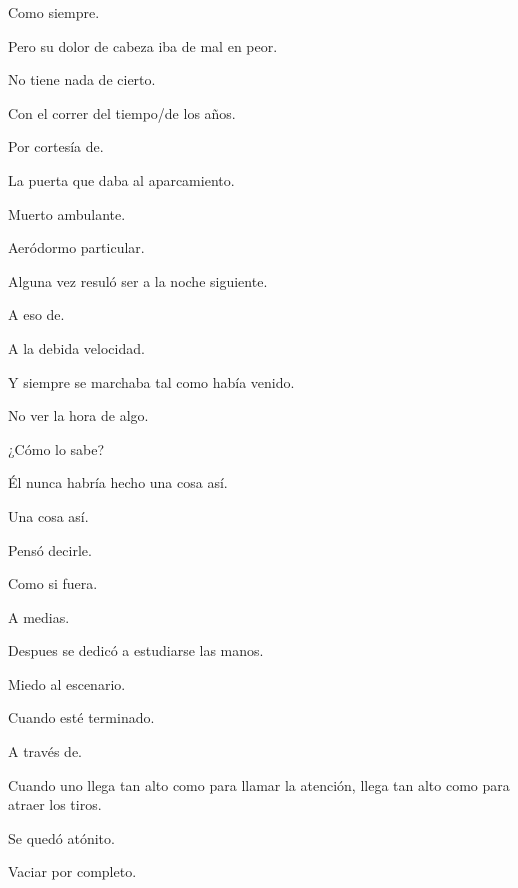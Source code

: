 \sk
Como siempre. 

\sk
Pero su dolor de cabeza iba de mal en peor. 

\sk
No tiene nada de cierto. 

\sk
Con el correr del tiempo/de los años. 

\sk
Por cortesía de. 

\sk
La puerta que daba al aparcamiento. 

\sk
Muerto ambulante. 

\sk
Aeródormo particular. 

\sk
Alguna vez resuló ser a la noche siguiente. 

\sk
A eso de. 

\sk
A la debida velocidad. 

\sk
Y siempre se marchaba tal como había venido. 

\sk
No ver la hora de algo. 

\sk
¿Cómo lo sabe? 

\sk
Él nunca habría hecho una cosa así.  

\sk
Una cosa así. 

\sk
Pensó decirle. 

\sk
Como si fuera. 

\sk
A medias. 

\sk
Despues se dedicó a estudiarse las manos. 

\sk
Miedo al escenario. 

\sk
Cuando esté terminado. 

\sk
A través de. 

\sk
Cuando uno llega tan alto como para llamar la atención, llega tan alto como para atraer los tiros. 

\sk
Se quedó atónito. 

\sk
Vaciar por completo. 

